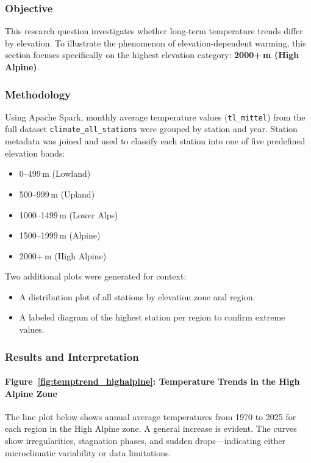 
\subsubsection{Objective}
This research question investigates whether long-term temperature trends differ by elevation. To illustrate the phenomenon of elevation-dependent warming, this section focuses specifically on the highest elevation category: \textbf{2000+\,m (High Alpine)}.

\subsubsection{Methodology}
Using Apache Spark, monthly average temperature values (\texttt{tl\_mittel}) from the full dataset \texttt{climate\_all\_stations} were grouped by station and year. Station metadata was joined and used to classify each station into one of five predefined elevation bands:
    \begin{itemize}
      \item 0--499\,m (Lowland)
      \item 500--999\,m (Upland)
      \item 1000--1499\,m (Lower Alps)
      \item 1500--1999\,m (Alpine)
      \item 2000+\,m (High Alpine)
    \end{itemize}
    
Two additional plots were generated for context:
\begin{itemize}
    \item A distribution plot of all stations by elevation zone and region.
    \item A labeled diagram of the highest station per region to confirm extreme values.
\end{itemize}

\subsubsection{Results and Interpretation}

\paragraph{Figure~\ref{fig:temptrend_highalpine}: Temperature Trends in the High Alpine Zone}
The line plot below shows annual average temperatures from 1970 to 2025 for each region in the High Alpine zone. A general increase is evident. The curves show irregularities, stagnation phases, and sudden drops—indicating either microclimatic variability or data limitations.


